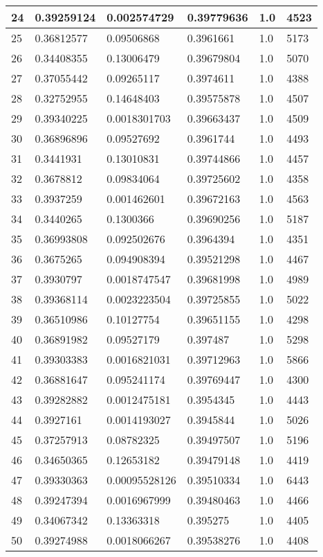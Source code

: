 \begin{longtable}{|l|l|l|l|l|l|}
24 & 0.39259124 & 0.002574729 & 0.39779636 & 1.0 & 4523 \\ \hline 
25 & 0.36812577 & 0.09506868 & 0.3961661 & 1.0 & 5173 \\ \hline 
26 & 0.34408355 & 0.13006479 & 0.39679804 & 1.0 & 5070 \\ \hline 
27 & 0.37055442 & 0.09265117 & 0.3974611 & 1.0 & 4388 \\ \hline 
28 & 0.32752955 & 0.14648403 & 0.39575878 & 1.0 & 4507 \\ \hline 
29 & 0.39340225 & 0.0018301703 & 0.39663437 & 1.0 & 4509 \\ \hline 
30 & 0.36896896 & 0.09527692 & 0.3961744 & 1.0 & 4493 \\ \hline 
31 & 0.3441931 & 0.13010831 & 0.39744866 & 1.0 & 4457 \\ \hline 
32 & 0.3678812 & 0.09834064 & 0.39725602 & 1.0 & 4358 \\ \hline 
33 & 0.3937259 & 0.001462601 & 0.39672163 & 1.0 & 4563 \\ \hline 
34 & 0.3440265 & 0.1300366 & 0.39690256 & 1.0 & 5187 \\ \hline 
35 & 0.36993808 & 0.092502676 & 0.3964394 & 1.0 & 4351 \\ \hline 
36 & 0.3675265 & 0.094908394 & 0.39521298 & 1.0 & 4467 \\ \hline 
37 & 0.3930797 & 0.0018747547 & 0.39681998 & 1.0 & 4989 \\ \hline 
38 & 0.39368114 & 0.0023223504 & 0.39725855 & 1.0 & 5022 \\ \hline 
39 & 0.36510986 & 0.10127754 & 0.39651155 & 1.0 & 4298 \\ \hline 
40 & 0.36891982 & 0.09527179 & 0.397487 & 1.0 & 5298 \\ \hline 
41 & 0.39303383 & 0.0016821031 & 0.39712963 & 1.0 & 5866 \\ \hline 
42 & 0.36881647 & 0.095241174 & 0.39769447 & 1.0 & 4300 \\ \hline 
43 & 0.39282882 & 0.0012475181 & 0.3954345 & 1.0 & 4443 \\ \hline 
44 & 0.3927161 & 0.0014193027 & 0.3945844 & 1.0 & 5026 \\ \hline 
45 & 0.37257913 & 0.08782325 & 0.39497507 & 1.0 & 5196 \\ \hline 
46 & 0.34650365 & 0.12653182 & 0.39479148 & 1.0 & 4419 \\ \hline 
47 & 0.39330363 & 0.00095528126 & 0.39510334 & 1.0 & 6443 \\ \hline 
48 & 0.39247394 & 0.0016967999 & 0.39480463 & 1.0 & 4466 \\ \hline 
49 & 0.34067342 & 0.13363318 & 0.395275 & 1.0 & 4405 \\ \hline 
50 & 0.39274988 & 0.0018066267 & 0.39538276 & 1.0 & 4408 \\ \hline 
\end{longtable}